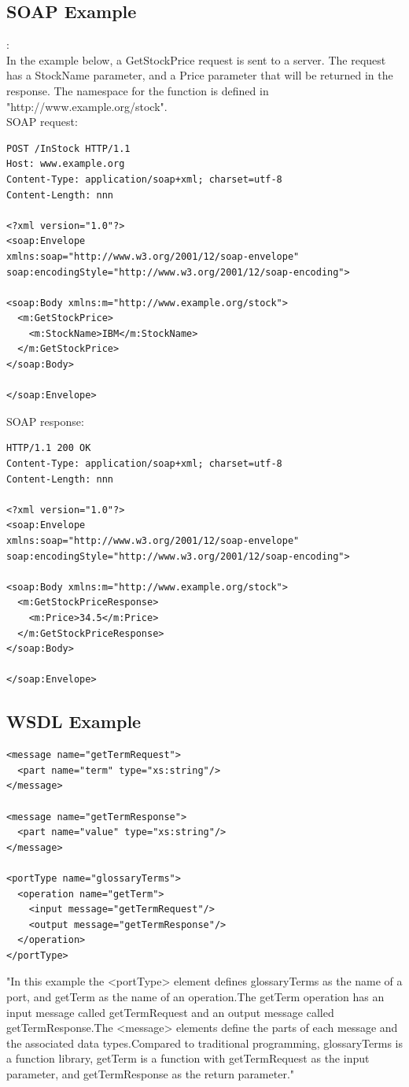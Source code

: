 \documentclass[12pt]{article}
\begin{document}
\subsection{SOAP Example}:
\\ In the example below, a GetStockPrice request is sent to a server. The request has a StockName parameter, and a Price parameter that will be returned in the response. The namespace for the function is defined in "http://www.example.org/stock".\\
SOAP request:
\begin{lstlisting}
POST /InStock HTTP/1.1
Host: www.example.org
Content-Type: application/soap+xml; charset=utf-8
Content-Length: nnn

<?xml version="1.0"?>
<soap:Envelope
xmlns:soap="http://www.w3.org/2001/12/soap-envelope"
soap:encodingStyle="http://www.w3.org/2001/12/soap-encoding">

<soap:Body xmlns:m="http://www.example.org/stock">
  <m:GetStockPrice>
    <m:StockName>IBM</m:StockName>
  </m:GetStockPrice>
</soap:Body>

</soap:Envelope>
\end{lstlisting}
SOAP response:
\begin{lstlisting}
HTTP/1.1 200 OK
Content-Type: application/soap+xml; charset=utf-8
Content-Length: nnn

<?xml version="1.0"?>
<soap:Envelope
xmlns:soap="http://www.w3.org/2001/12/soap-envelope"
soap:encodingStyle="http://www.w3.org/2001/12/soap-encoding">

<soap:Body xmlns:m="http://www.example.org/stock">
  <m:GetStockPriceResponse>
    <m:Price>34.5</m:Price>
  </m:GetStockPriceResponse>
</soap:Body>

</soap:Envelope>
\end{lstlisting}

\subsection{WSDL Example}
\label{sec:wsdlexaple}
\begin{lstlisting}
<message name="getTermRequest">
  <part name="term" type="xs:string"/>
</message>

<message name="getTermResponse">
  <part name="value" type="xs:string"/>
</message>

<portType name="glossaryTerms">
  <operation name="getTerm">
    <input message="getTermRequest"/>
    <output message="getTermResponse"/>
  </operation>
</portType>
\end{lstlisting}
"In this example the <portType> element defines glossaryTerms as the name of a port, and getTerm as the name of an operation.The getTerm operation has an input message called getTermRequest and an output message called getTermResponse.The <message> elements define the parts of each message and the associated data types.Compared to traditional programming, glossaryTerms is a function library, getTerm is a function with getTermRequest as the input parameter, and getTermResponse as the return parameter."\cite{wsdl}
\end{document}
